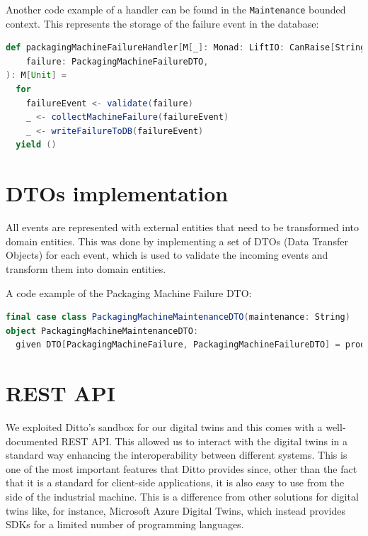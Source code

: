 Another code example of a handler can be found in the \texttt{Maintenance} bounded context.
This represents the storage of the failure event in the database:

\begin{lstlisting}[language=Scala]
def packagingMachineFailureHandler[M[_]: Monad: LiftIO: CanRaise[String]](
    failure: PackagingMachineFailureDTO,
): M[Unit] =
  for
    failureEvent <- validate(failure)
    _ <- collectMachineFailure(failureEvent)
    _ <- writeFailureToDB(failureEvent)
  yield ()
\end{lstlisting}

\section{DTOs implementation}
All events are represented with external entities that need to be transformed into domain entities.
This was done by implementing a set of DTOs (Data Transfer Objects) for each event, which is used to validate the incoming events and transform them into domain entities.

A code example of the Packaging Machine Failure DTO:

\begin{lstlisting}[language=Scala]
final case class PackagingMachineMaintenanceDTO(maintenance: String)
object PackagingMachineMaintenanceDTO:
  given DTO[PackagingMachineFailure, PackagingMachineFailureDTO] = productTypeDTO

\end{lstlisting}

\section{REST API}
We exploited Ditto's sandbox for our digital twins and this comes with a well-documented REST API.
This allowed us to interact with the digital twins in a standard way enhancing the interoperability between different systems.
This is one of the most important features that Ditto provides since, other than the fact that it is a standard for client-side applications, it is also easy to use from the side of the industrial machine.
This is a difference from other solutions for digital twins like, for instance, Microsoft Azure Digital Twins, which instead provides SDKs for a limited number of programming languages.

